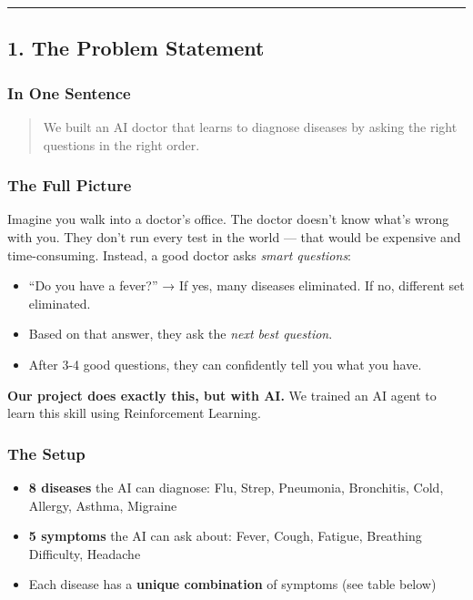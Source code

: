 \documentclass[
]{article}
\providecommand{\tightlist}{%
  \setlength{\itemsep}{0pt}\setlength{\parskip}{0pt}}
\begin{document}
\begin{center}\rule{0.5\linewidth}{0.5pt}\end{center}

\hypertarget{the-problem-statement}{%
\subsection{1. The Problem Statement}\label{the-problem-statement}}

\hypertarget{in-one-sentence}{%
\subsubsection{In One Sentence}\label{in-one-sentence}}

\begin{quote}
We built an AI doctor that learns to diagnose diseases by asking the
right questions in the right order.
\end{quote}

\hypertarget{the-full-picture}{%
\subsubsection{The Full Picture}\label{the-full-picture}}

Imagine you walk into a doctor's office. The doctor doesn't know what's
wrong with you. They don't run every test in the world --- that would be
expensive and time-consuming. Instead, a good doctor asks \emph{smart
questions}:

\begin{itemize}
\tightlist
\item
  ``Do you have a fever?'' → If yes, many diseases eliminated. If no,
  different set eliminated.
\item
  Based on that answer, they ask the \emph{next best question}.
\item
  After 3-4 good questions, they can confidently tell you what you have.
\end{itemize}

\textbf{Our project does exactly this, but with AI.} We trained an AI
agent to learn this skill using Reinforcement Learning.

\hypertarget{the-setup}{%
\subsubsection{The Setup}\label{the-setup}}

\begin{itemize}
\tightlist
\item
  \textbf{8 diseases} the AI can diagnose: Flu, Strep, Pneumonia,
  Bronchitis, Cold, Allergy, Asthma, Migraine
\item
  \textbf{5 symptoms} the AI can ask about: Fever, Cough, Fatigue,
  Breathing Difficulty, Headache
\item
  Each disease has a \textbf{unique combination} of symptoms (see table
  below)
\end{itemize}
\end{document}
